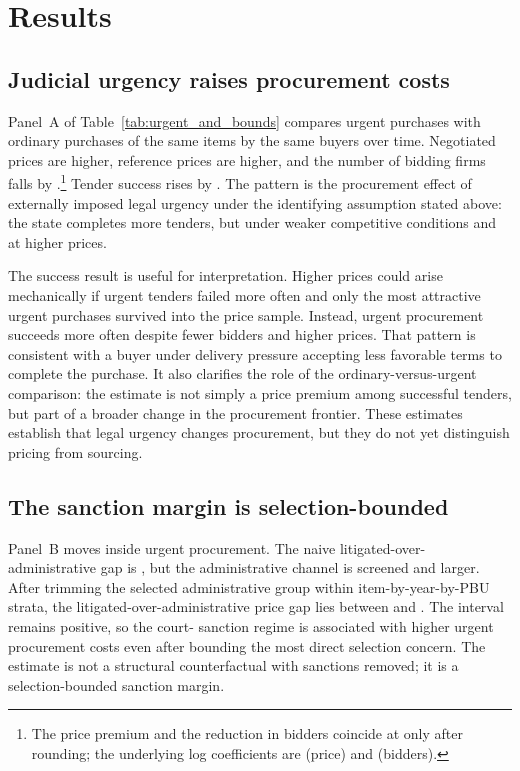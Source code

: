 \section{Results}
\label{sec:results}

\subsection{Judicial urgency raises procurement costs}
\label{subsec:urgent_results}

Panel~A of Table~\ref{tab:urgent_and_bounds} compares urgent
purchases with ordinary purchases of the same items by the same buyers
over time. Negotiated prices are
\BPnegPctHeadline{} higher, reference prices are \BPrefPctPreferred{}
higher, and the number of bidding firms falls by
\BPfirmsPctHeadlineAbs{}.\footnote{The price premium and the reduction
in bidders coincide at \BPfirmsPctHeadlineAbs{} only after rounding;
the underlying log coefficients are \BPnegCoef{} (price) and
\BPfirmsCoef{} (bidders).} Tender success rises by \BPsuccessPP{}.
The pattern is the procurement effect of externally imposed legal
urgency under the identifying assumption stated above: the state
completes more tenders, but under weaker competitive conditions and at
higher prices.

The success result is useful for interpretation. Higher prices
could arise mechanically if urgent tenders failed more often and only
the most attractive urgent purchases survived into the price sample.
Instead, urgent procurement succeeds more often despite fewer bidders
and higher prices. That pattern is consistent with a buyer under
delivery pressure accepting less favorable terms to complete the
purchase. It also clarifies the role of the ordinary-versus-urgent
comparison: the estimate is not simply a price premium among
successful tenders, but part of a broader change in the procurement
frontier. These estimates establish that legal urgency changes
procurement, but they do not yet distinguish pricing from sourcing.



\subsection{The sanction margin is selection-bounded}
\label{subsec:utg_bounds}

Panel~B moves inside urgent procurement. The naive
litigated-over-administrative gap is \BPutgPointNaive{}, but the
administrative channel is screened and larger. After trimming the selected
administrative group within item-by-year-by-PBU strata, the
litigated-over-administrative price gap lies between \BPutgBoundLow{}
and \BPutgBoundHigh{}. The interval remains positive, so the court-
sanction regime is associated with higher urgent procurement costs
even after bounding the most direct selection concern. The estimate
is not a structural counterfactual with sanctions removed; it is a
selection-bounded sanction margin.


